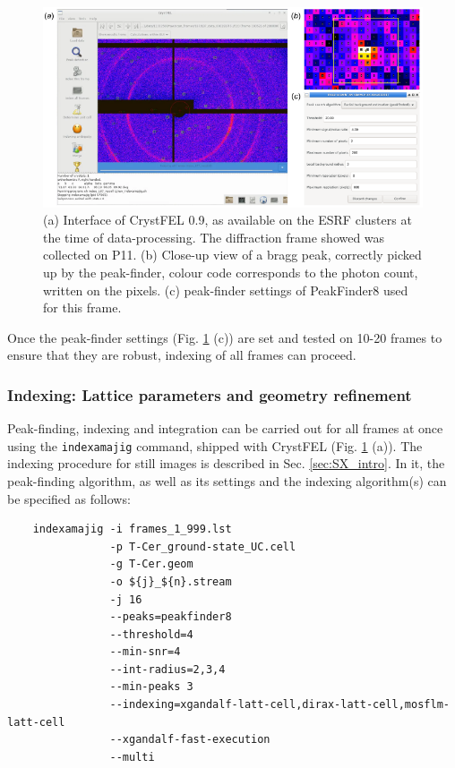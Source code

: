 \begin{figure}[H] 
    \centering
        \noindent \includegraphics[width=\textwidth]{images/T-Cer/CrystFEL_peak.pdf}
    \caption{(a) Interface of CrystFEL 0.9, as available on the ESRF clusters at the time of data-processing. The diffraction frame showed was collected on P11. (b) Close-up view of a bragg peak, correctly picked up by the peak-finder, colour code corresponds to the photon count, written on the pixels. (c) peak-finder settings of PeakFinder8 used for this frame.}\label{fig:CrystFEL_analysis}
\end{figure}



Once the peak-finder settings (Fig. \ref{fig:CrystFEL_analysis} (c)) are set and tested on 10-20 frames to ensure that they are robust, indexing of all frames can proceed. 


\subsubsection{Indexing: Lattice parameters and geometry refinement}



Peak-finding, indexing and integration can be carried out for all frames at once using the \texttt{indexamajig} command, shipped with CrystFEL (Fig. \ref{fig:CrystFEL_analysis} (a)). The indexing procedure for still images is described in Sec. \ref{sec:SX_intro}. In it, the peak-finding algorithm, as well as its settings and the indexing algorithm(s) can be specified as follows: 

\begin{verbatim}
    indexamajig -i frames_1_999.lst
                -p T-Cer_ground-state_UC.cell
                -g T-Cer.geom
                -o ${j}_${n}.stream
                -j 16
                --peaks=peakfinder8
                --threshold=4
                --min-snr=4
                --int-radius=2,3,4
                --min-peaks 3
                --indexing=xgandalf-latt-cell,dirax-latt-cell,mosflm-latt-cell
                --xgandalf-fast-execution
                --multi
\end{verbatim}


